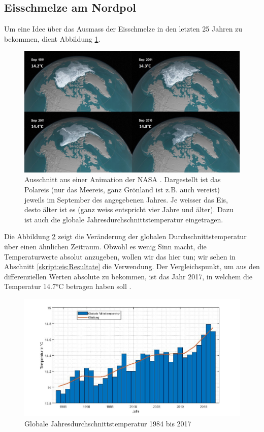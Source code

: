 \begin{refsection}
\subsection{Eisschmelze am Nordpol}
Um eine Idee über das Ausmass der Eisschmelze in den letzten 25 Jahren zu bekommen, dient Abbildung \ref{skript:eis:fig:NASAohne}.
\begin{figure}
	\centering
	\includegraphics[width=14cm]{eis/NASA_ohne_Breitengraden.jpg}
	\caption{Ausschnitt aus einer Animation der NASA \cite{skript:eis:animation_NASA}. Dargestellt ist das Polareis (nur das Meereis, ganz Grönland ist z.B. auch vereist) jeweils im September des angegebenen Jahres. Je weisser das Eis, desto älter ist es (ganz weiss entspricht vier Jahre und älter).	Dazu ist auch die globale Jahresdurchschnittstemperatur eingetragen.}
	\label{skript:eis:fig:NASAohne}
\end{figure}
Die Abbildung \ref{skript:eis:fig:globale_Mitteltemperaturen} zeigt die Veränderung der globalen Durchschnittstemperatur über einen ähnlichen Zeitraum. Obwohl es wenig Sinn macht, die Temperaturwerte absolut anzugeben, wollen wir das hier tun; wir sehen in Abschnitt \ref{skript:eis:Resultate} die Verwendung. Der Vergleichspunkt, um aus den differenziellen Werten \cite{skript:eis:vitalsign_NASA} absolute zu bekommen, ist das Jahr 2017, in welchem die Temperatur 14.7°C
betragen haben soll
\cite{skript:eis:ref2017}.
\begin{figure}
	\centering
	\includegraphics[width=14cm]{eis/globale_Mitteltemperaturen.jpg}
	\caption{Globale Jahresdurchschnittstemperatur 1984 bis 2017}
	\label{skript:eis:fig:globale_Mitteltemperaturen}
\end{figure}

\end{refsection}
